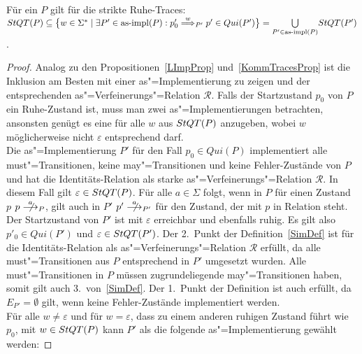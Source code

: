 \begin{Prop}
  \label{RuheTraceProp}
  Für ein \MEIO{} $P$ gilt für die strikte Ruhe-Traces: $\StQT (P) \subseteq
  \big\{w\in\Sigma ^*\mid \exists P'\in\asimp (P): p'_0 \weakmust[w]_{P'}
  p'\in Qui(P')\big\} = \underset{P'\in\asimp (P)}{\bigcup} \StQT (P')$.
\end{Prop}
\begin{proof}
  Analog zu den Propositionen~\ref{LImpProp} und~\ref{KommTracesProp} ist die
  Inklusion am Besten mit einer as"=Implementierung zu zeigen und der
  entsprechenden as"=Verfeinerungs"=Relation $\mathcal{R}$. Falls der
  Startzustand $p_0$ von $P$ ein Ruhe-Zustand ist, muss man zwei
  as"=Implementierungen betrachten, ansonsten genügt es eine für alle $w$ aus
  $StQT (P)$ anzugeben, wobei $w$ möglicherweise nicht $\varepsilon$
  entsprechend darf.\\
  Die as"=Implementierung $P'$ für den Fall $p_0\in Qui (P)$ implementiert alle
  must"=Transitionen, keine may"=Transitionen und keine Fehler-Zustände von $P$
  und hat die Identitäts-Relation als starke as"=Verfeinerungs"=Relation
  $\mathcal{R}$. In diesem Fall gilt $\varepsilon\in StQT (P)$. Für alle
  $a\in\Sigma$ folgt, wenn in $P$ für einen Zustand $p$ $p\nmust[a]_P$, gilt
  auch in $P'$ $p' \nmust[a]_{P'}$ für den Zustand, der mit $p$ in Relation
  steht. Der Startzustand von $P'$ ist mit $\varepsilon$ erreichbar und
  ebenfalls ruhig. Es gilt also $p'_0\in Qui (P')$ und $\varepsilon\in StQT
  (P')$. Der 2.\ Punkt der Definition~\ref{SimDef} ist für die
  Identitäts-Relation als as"=Verfeinerungs"=Relation $\mathcal{R}$ erfüllt, da
  alle must"=Transitionen aus $P$ entsprechend in $P'$ umgesetzt wurden. Alle
  must"=Transitionen in $P$ müssen zugrundeliegende may"=Transitionen haben,
  somit gilt auch 3.\ von~\ref{SimDef}. Der 1.\ Punkt der Definition ist auch
  erfüllt, da $E_{P'}=\emptyset$ gilt, wenn keine Fehler-Zustände implementiert
  werden.\\
  Für alle $w\neq \varepsilon$ und für $w = \varepsilon$, dass zu einem anderen
  ruhigen Zustand führt wie $p_0$, mit $w\in StQT (P)$ kann $P'$ als die
  folgende as"=Implementierung gewählt werden:
\end{proof}
